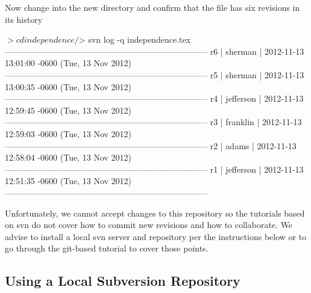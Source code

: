 Now change into the new directory and confirm that the file has six revisions in its history
\begin{CodeVerbatim}
$> cd independence/
$> svn log -q independence.tex 
------------------------------------------------------------------------
r6 | sherman | 2012-11-13 13:01:00 -0600 (Tue, 13 Nov 2012)
------------------------------------------------------------------------
r5 | sherman | 2012-11-13 13:00:35 -0600 (Tue, 13 Nov 2012)
------------------------------------------------------------------------
r4 | jefferson | 2012-11-13 12:59:45 -0600 (Tue, 13 Nov 2012)
------------------------------------------------------------------------
r3 | franklin | 2012-11-13 12:59:03 -0600 (Tue, 13 Nov 2012)
------------------------------------------------------------------------
r2 | adams | 2012-11-13 12:58:04 -0600 (Tue, 13 Nov 2012)
------------------------------------------------------------------------
r1 | jefferson | 2012-11-13 12:51:35 -0600 (Tue, 13 Nov 2012)
------------------------------------------------------------------------
\end{CodeVerbatim}

Unfortunately, we cannot accept changes to this repository so the tutorials based on svn do not cover how to commit new revisions and how to collaborate.  We advise to install a local svn server and repository per the instructions below or to go through the git-based tutorial to cover those points.

\subsection{Using a Local Subversion Repository} \label{sec:example-svn-local}


